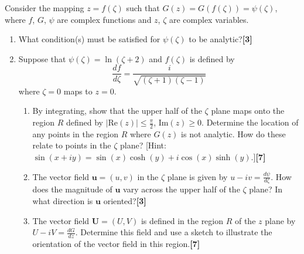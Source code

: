 \documentclass[a4paper]{article}
\begin{document}
\begin{qns}
Consider the mapping $z = f(\zeta)$ such that $G(z) = G(f(\zeta)) =\psi(\zeta)$, where $f$, $G$, $\psi$ are complex functions and $z$, $\zeta$ are complex variables.
\begin{enumerate}[label=(\alph*)]
\item What condition(s) must be satisfied for $\psi(\zeta)$ to be analytic?\hfill\textbf{[3]}
\item Suppose that $\psi(\zeta)=\ln(\zeta+2)$ and $f(\zeta)$ is defined by
\begin{equation}
\frac{df}{d\zeta}=\frac{i}{\sqrt{(\zeta+1)(\zeta-1)}}\tag{*}
\end{equation}
where $\zeta=0$ maps to $z = 0$.
\begin{enumerate}[label=(\roman*)]
\item By integrating, show that the upper half of the $\zeta$ plane maps onto the region $R$ defined by $|\text{Re}(z)|\leq\frac{\pi}{2}$, $\text{Im}(z)\geq 0$. Determine the location of any points in the region $R$ where $G(z)$ is not analytic. How do these relate to points in the $\zeta$ plane? [Hint: $\sin(x + iy) = \sin(x) \cosh(y) + i \cos(x) \sinh(y)$.]\hfill\textbf{[7]}
\item The vector field $\mathbf{u} = (u, v)$ in the $\zeta$ plane is given by $u − iv =\frac{d\psi}{d\zeta}$. How does the magnitude of $\mathbf{u}$ vary across the upper half of the $\zeta$ plane? In what direction is $\mathbf{u}$ oriented?\hfill\textbf{[3]}
\item The vector field $\mathbf{U} = (U, V )$ is defined in the region $R$ of the $z$ plane by $U − iV =\frac{dG}{dz}$. Determine this field and use a sketch to illustrate the orientation of the vector field in this region.\hfill\textbf{[7]}
\end{enumerate}
\end{enumerate}
\end{qns}
\end{document}
